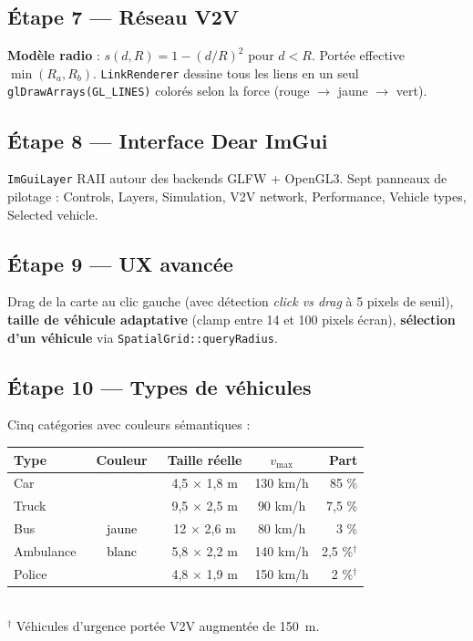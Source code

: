 \documentclass[a4paper,11pt]{article}
\begin{document}
\subsection*{\'Etape 7 — R\'eseau V2V}

\textbf{Mod\`ele radio} : $s(d, R) = 1 - (d/R)^2$ pour $d < R$. Port\'ee
effective $\min(R_a, R_b)$. \texttt{LinkRenderer} dessine tous les liens
en un seul \texttt{glDrawArrays(GL\_LINES)} color\'es selon la force
(rouge $\rightarrow$ jaune $\rightarrow$ vert).

\subsection*{\'Etape 8 — Interface Dear ImGui}

\texttt{ImGuiLayer} RAII autour des backends GLFW + OpenGL3. Sept panneaux
de pilotage : Controls, Layers, Simulation, V2V network, Performance,
Vehicle types, Selected vehicle.

\subsection*{\'Etape 9 — UX avanc\'ee}

Drag de la carte au clic gauche (avec d\'etection \emph{click vs drag} \`a 5
pixels de seuil), \textbf{taille de v\'ehicule adaptative} (clamp entre 14 et
100 pixels \'ecran), \textbf{s\'election d'un v\'ehicule} via
\texttt{SpatialGrid::queryRadius}.

\subsection*{\'Etape 10 — Types de v\'ehicules}

Cinq cat\'egories avec couleurs s\'emantiques :

\begin{center}\small
\begin{tabular}{lcccr}
\toprule\rowcolor{soft}
\textbf{Type} & \textbf{Couleur} & \textbf{Taille r\'eelle} & \textbf{$v_{\max}$} & \textbf{Part}\\\midrule
Car        & \cellcolor[HTML]{4DC7F4}\textcolor{white}{bleu ciel}   & 4{,}5 $\times$ 1{,}8 m & 130 km/h & 85 \%\\
Truck      & \cellcolor[HTML]{8C8F9F}\textcolor{white}{gris}        & 9{,}5 $\times$ 2{,}5 m & 90 km/h  & 7{,}5 \%\\
Bus        & \cellcolor[HTML]{F7C633}\textcolor{black}{jaune}       & 12 $\times$ 2{,}6 m    & 80 km/h  & 3 \%\\
Ambulance  & \cellcolor[HTML]{F5F5F5}\textcolor{black}{blanc}       & 5{,}8 $\times$ 2{,}2 m & 140 km/h & 2{,}5 \%$^{\dagger}$\\
Police     & \cellcolor[HTML]{4072FA}\textcolor{white}{bleu marine} & 4{,}8 $\times$ 1{,}9 m & 150 km/h & 2 \%$^{\dagger}$\\\bottomrule
\end{tabular}\\
{\footnotesize $^{\dagger}$ V\'ehicules d'urgence \textemdash{} port\'ee V2V augment\'ee de 150~m.}
\end{center}
\end{document}
